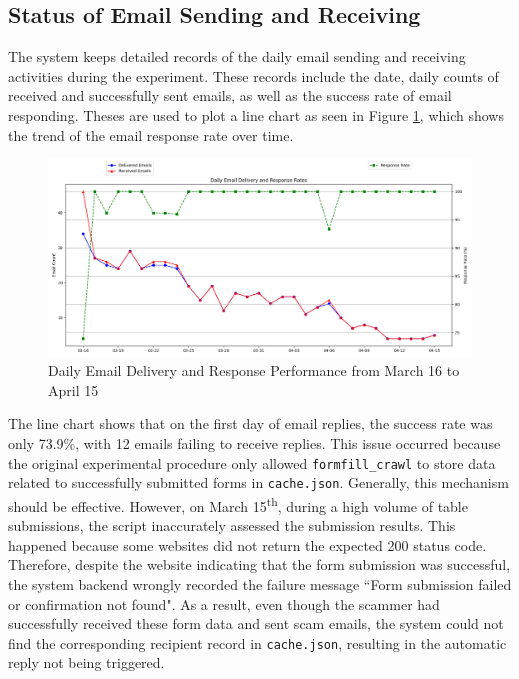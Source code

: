 \documentclass[ oneside,%
                    author={Cassie Qing Tang},
                    degree={BSc},
                     title={An Automated Response System for Disrupting Online Pet Scamming \\ },
                    subtitle={ }]{dissertation}
\begin{document}
\subsection{Status of Email Sending and Receiving}
The system keeps detailed records of the daily email sending and receiving activities during the experiment. These records include the date, daily counts of received and successfully sent emails, as well as the success rate of email responding. Theses are used to plot a line chart as seen in Figure \ref{fig:pic12}, which shows the trend of the email response rate over time.
\begin{figure}[H]
\centering
\includegraphics[width=\linewidth]{pic/figure12.png}
\caption{Daily Email Delivery and Response Performance from March 16 to April 15}
\label{fig:pic12}
\end{figure}

The line chart shows that on the first day of email replies, the success rate was only 73.9\%, with 12 emails failing to receive replies. This issue occurred because the original experimental procedure only allowed \texttt{formfill\_crawl} to store data related to successfully submitted forms in \texttt{cache.json}. Generally, this mechanism should be effective. However, on March 15\textsuperscript{th}, during a high volume of table submissions, the script inaccurately assessed the submission results. This happened because some websites did not return the expected 200 status code. Therefore, despite the website indicating that the form submission was successful, the system backend wrongly recorded the failure message ``Form submission failed or confirmation not found". As a result, even though the scammer had successfully received these form data and sent scam emails, the system could not find the corresponding recipient record in \texttt{cache.json}, resulting in the automatic reply not being triggered.
\\
\end{document}
